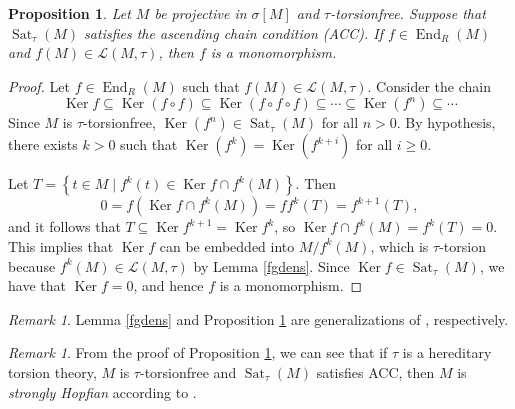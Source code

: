 \documentclass{amsart}
\newtheorem{prop}[thm]{Proposition}
\theoremstyle{definition}
\theoremstyle{remark}
\newtheorem{rem}[thm]{Remark}
\numberwithin{equation}{section}
\DeclareMathOperator{\Ker}{Ker}
\DeclareMathOperator{\End}{End}
\DeclareMathOperator{\Sat}{Sat}
\newcommand{\sm}{\sigma[M]}
\begin{document}
	\begin{prop}\label{monoL}
		Let $M$ be projective in $\sm$ and $\tau$-torsionfree. 
		Suppose that $\Sat_\tau(M)$ satisfies the ascending chain condition (ACC). 
		If $f\in\End_R(M)$ and $f(M)\in\mathcal{L}(M,\tau)$,
		then $f$ is a monomorphism.
	\end{prop}
	
	\begin{proof}
		Let $f\in\End_R(M)$ such that $f(M)\in\mathcal{L}(M,\tau)$. 
		Consider the chain
		\[\Ker f\subseteq \Ker(f\circ f)\subseteq\Ker(f\circ f\circ f)\subseteq \cdots\subseteq \Ker(f^{n})\subseteq\cdots\]
		Since $M$ is $\tau$-torsionfree, 
		$\Ker(f^n)\in\Sat_\tau(M)$ for all $n>0$. 
		By hypothesis, there exists $k>0$ such that 
		$\Ker(f^k)=\Ker(f^{k+i})$ for all $i\geq 0$. 
		
		Let $T = \left \{ t \in M \mid f^k (t) \in \Ker f \cap f^k (M) \right \}$.
		Then
		\[0=f(\Ker f\cap f^k(M))=ff^k(T)=f^{k+1}(T),\]
		and it follows that $T\subseteq\Ker f^{k+1}=\Ker f^{k}$,
		so $\Ker f\cap f^{k}(M)=f^{k}(T)=0$. 
		This implies that $\Ker f$ can be embedded into $M/f^k(M)$, 
		which is $\tau$-torsion because $f^{k}(M)\in\mathcal{L}(M,\tau)$ 
		by Lemma \ref{fgdens}. 
		Since $\Ker f \in \Sat_\tau(M)$,
		we have that $\Ker f=0$, 
		and hence $f$ is a monomorphism.
	\end{proof}
	
	\begin{rem}
		Lemma \ref{fgdens} and Proposition \ref{monoL} are generalizations of 
		\cite[Lemma 3.11 and Proposition 3.12]{PepeKrull}, respectively.
	\end{rem}
	
	\begin{rem}
		From the proof of Proposition \ref{monoL}, we can see that if $\tau$ is a hereditary torsion theory, $M$ is $\tau$-torsionfree and $\Sat_\tau(M)$ satisfies ACC, then $M$ is \emph{strongly Hopfian} according to \cite{hmaimou2007generalized}.
	\end{rem}
	
\end{document}
